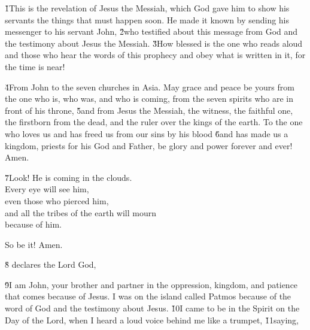


\v{1}This is the revelation of Jesus the Messiah, which God gave him to show his servants the things that must happen soon. He made it known by sending his messenger to his servant John, \v{2}who testified about this message from God and the testimony about Jesus the Messiah. \v{3}How blessed is the one who reads aloud and those who hear the words of this prophecy and obey what is written in it, for the time is near!

\v{4}From John to the seven churches in Asia. May grace and peace be yours from the one who is, who was, and who is coming, from the seven spirits who are in front of his throne, \v{5}and from Jesus the Messiah, the witness, the faithful one, the firstborn from the dead, and the ruler over the kings of the earth. To the one who loves us and has freed us from our sins by his blood \v{6}and has made us a kingdom, priests for his God and Father, be glory and power forever and ever! Amen.

\begin{poetry}
\poeml \v{7}Look! He is coming in the clouds. \\
\poemll    Every eye will see him, \\
\poemlll       even those who pierced him, \\
\poeml and all the tribes of the earth will mourn \\
\poemll    because of him.
\end{poetry}

So be it! Amen.

\v{8} declares the Lord God,

\v{9}I am John, your brother and partner in the oppression, kingdom, and patience that comes because of Jesus. I was on the island called Patmos because of the word of God and the testimony about Jesus. \v{10}I came to be in the Spirit on the Day of the Lord, when I heard a loud voice behind me like a trumpet, \v{11}saying, 


